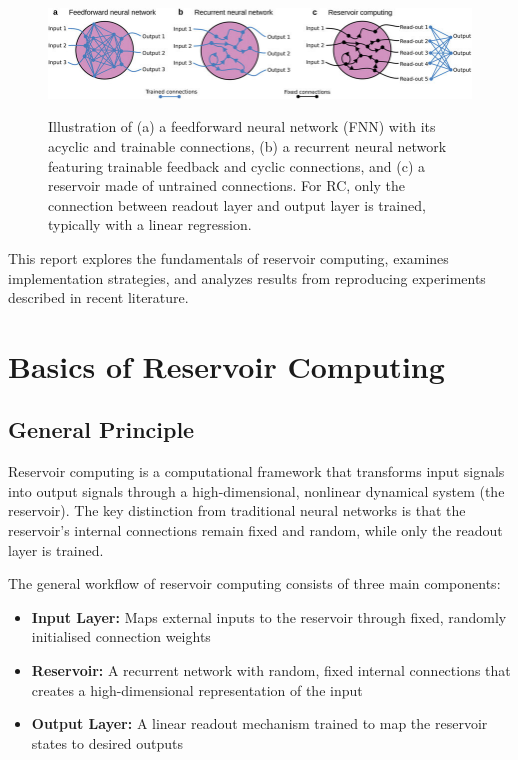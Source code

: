 \documentclass[numbered]{ivt-style/standard}
\begin{document}
\begin{figure}[H]
    \centering
    \includegraphics[width=1.0\linewidth]{figures/rc_difference_with others.png}
    \caption{Illustration of (a) a feedforward neural network (FNN) with its acyclic and trainable connections, (b) a recurrent neural network featuring trainable feedback and cyclic connections, and (c) a reservoir made of untrained connections. For RC, only the connection between readout layer and output layer is trained, typically with a linear regression.}
    \label{fig:rc_diff}
    \cite{article_RC_intro}
\end{figure}

This report explores the fundamentals of reservoir computing, examines implementation strategies, and analyzes results from reproducing experiments described in recent literature. 


\section{Basics of Reservoir Computing}

\subsection{General Principle}
Reservoir computing is a computational framework that transforms input signals into output signals through a high-dimensional, nonlinear dynamical system (the reservoir). The key distinction from traditional neural networks is that the reservoir's internal connections remain fixed and random, while only the readout layer is trained. \cite{article_RC_intro}


The general workflow of reservoir computing consists of three main components:
\begin{itemize}
    \item \textbf{Input Layer:} Maps external inputs to the reservoir through fixed, randomly initialised connection weights
    \item \textbf{Reservoir:} A recurrent network with random, fixed internal connections that creates a high-dimensional representation of the input
    \item \textbf{Output Layer:} A linear readout mechanism trained to map the reservoir states to desired outputs
\end{itemize}    
\end{document}
